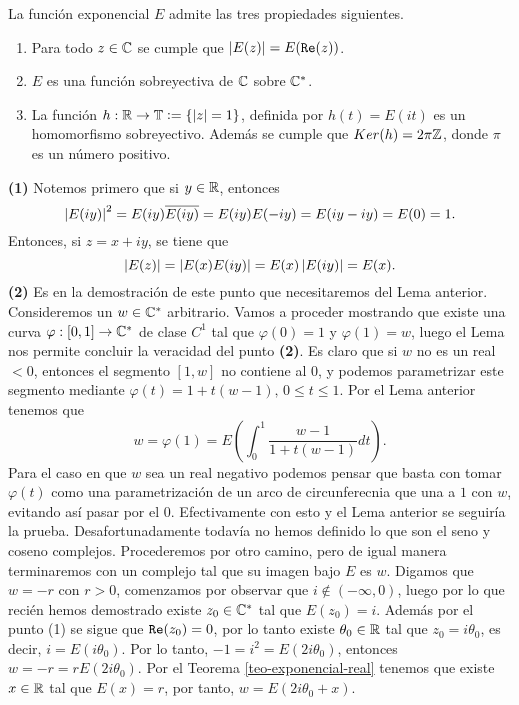 \begin{theo}\label{teo-propiedades2-exp}
  La función exponencial \(E\) admite las tres propiedades siguientes.
  \begin{enumerate}
    \item Para todo \(z\in \C\) se cumple que \(\abs{E(z)} = E(\Real(z))\).
    \item \(E\) es una función sobreyectiva de \(\C\) sobre \(\C^*\). 
    \item La función \(h: \R \rightarrow \mathbb{T}\vcentcolon = \{\abs{z} = 1\} \), definida por  \(h(t) = E(it) \) es un homomorfismo sobreyectivo. 
    Además se cumple que \( Ker(h) = 2\pi\Z\), donde \(\pi\) es un número positivo.
  \end{enumerate}
\end{theo}
\begin{dem}
   {\bf (1)} Notemos primero que si \(y \in \R \), entonces 
    \[
    \abs{E(iy)}^2 = E(iy)\conj{E(iy)} = E(iy)E(-iy)= E(iy-iy) = E(0) = 1.
    \]
    Entonces, si \(z=x+iy\), se tiene que 
    \[
    \abs{E(z)} = \abs{E(x)E(iy)} = E(x)\abs{E(iy)} = E(x).
    \]
    {\bf (2)} Es en la demostración de este punto que necesitaremos del Lema anterior. 
    Consideremos un \(w \in \C^*\) arbitrario. Vamos a proceder mostrando que existe una
    curva \(\varphi : [0,1] \rightarrow \C^*\) de clase \(C^1\) tal que \(\varphi(0) = 1\)
    y \(\varphi(1) = w\), luego  el Lema nos permite concluir la veracidad del punto {\bf (2)}.
    Es claro que si \(w\) no es un real \(< 0\), entonces el segmento \([1,w]\) no contiene al
    \(0\), y podemos parametrizar este segmento mediante \(\varphi(t) = 1 + t(w-1),\, 0\leq t\leq 1\). Por el Lema anterior
    tenemos que \[w = \varphi(1) = E\left(\int_{0}^{1}\frac{w-1}{1 + t(w-1)}dt\right).\]
    Para el caso en que \(w\) sea un real negativo podemos pensar que basta con tomar \(\varphi(t)\) como una parametrización de un arco
    de circunferecnia que una a \(1\) con \(w\), evitando así pasar por el 0. Efectivamente con esto y el Lema anterior se seguiría la prueba. Desafortunadamente 
    todavía no hemos definido lo que son el seno y coseno complejos. Procederemos por otro camino, pero de igual manera terminaremos 
    con un complejo tal que su imagen bajo \(E\) es \(w\).
    Digamos que \(w=-r\) con \(r>0\), comenzamos por observar que \(i \not \in (-\infty, 0)\), 
    luego por lo que recién hemos demostrado existe \(z_0\in \C^*\) tal que \(E(z_0)=i\). 
    Además por el punto (1) se sigue que \(\Real(z_0) = 0\), por lo tanto existe \(\theta_0 \in \R\) tal que \(z_0 = i\theta_0\), 
    es decir, \(i = E(i\theta_0)\).
    Por lo tanto, \(-1 = i^2 = E(2i\theta_0)\), entonces \(w = -r = rE(2i\theta_0)\). Por el Teorema \ref{teo-exponencial-real} tenemos que
    existe \(x\in \R\) tal que \(E(x) = r\), por tanto, \(w = E(2i\theta_0 + x) \). 
    \begin{figure}[H]
        \centering
        \begin{tikzpicture}[scale=1]
        

\end{tikzpicture}
\end{figure}
\end{dem}
